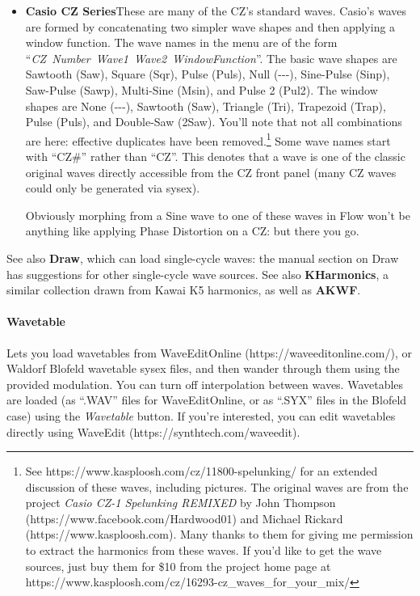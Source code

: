 \documentclass{article}
\begin{document}
\begin{itemize}
\item{\bf Casio CZ Series}\quad These are many of the CZ's standard waves.  Casio's waves are formed by concatenating two simpler wave shapes and then applying a window function.  The wave names in the menu are of the form ``\mbox{\it CZ Number Wave1 Wave2 WindowFunction}''.  The basic wave shapes are Sawtooth (Saw), Square (Sqr), Pulse (Puls), Null (-{}-{}-), Sine-Pulse (Sinp), Saw-Pulse (Sawp), Multi-Sine (Msin), and Pulse 2 (Pul2).  The window shapes are None (-{}-{}-), Sawtooth (Saw), Triangle (Tri), Trapezoid (Trap), Pulse (Puls), and Double-Saw (2Saw).  You'll note that not all combinations are here: effective duplicates have been removed.\footnote{See https:/\!/www.kasploosh.com/cz/11800-spelunking/ for an extended discussion of these waves, including pictures.  The original waves are from the project {\it Casio CZ-1 Spelunking REMIXED} by John Thompson (https:/\!/www.facebook.com/Hardwood01) and Michael Rickard  (https:/\!/www.kasploosh.com).  Many thanks to them for giving me permission to extract the harmonics from these waves.  If you'd like to get the wave sources, just buy them for \$10 from the project home page at https:/\!/www.kasploosh.com/cz/16293-cz\_waves\_for\_your\_mix/}  Some wave names start with ``CZ\#'' rather than ``CZ''.  This denotes that a wave is one of the classic original waves directly accessible from the CZ front panel (many CZ waves could only be generated via sysex).

Obviously morphing from a Sine wave to one of these waves in Flow won't be anything like applying Phase Distortion on a CZ: but there you go.
\end{itemize}

See also {\bf Draw}, which can load single-cycle waves: the manual section on Draw has suggestions for other single-cycle wave sources.  See also {\bf KHarmonics}, a similar collection drawn from Kawai K5 harmonics, as well as {\bf AKWF}.

\paragraph{Wavetable}  Lets you load wavetables from WaveEditOnline (https:/\!/waveeditonline.com/), or Waldorf Blofeld wavetable sysex files, and then wander through them using the provided modulation.  You can turn off interpolation between waves.  Wavetables are loaded (as ``.WAV'' files for WaveEditOnline, or as ``.SYX'' files in the Blofeld case) using the {\it Wavetable} button.  If you're interested, you can edit wavetables directly using WaveEdit (https:/\!/synthtech.com/waveedit).
\end{document}
